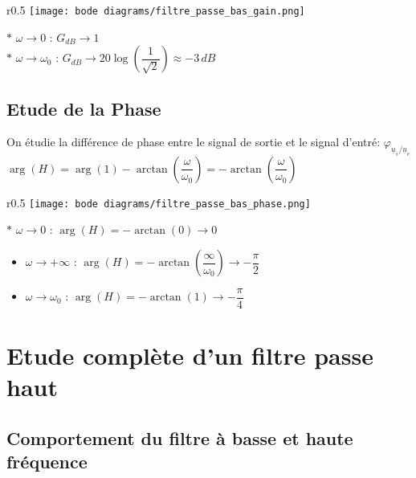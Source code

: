 \documentclass{article}
\begin{document}
\begin{wrapfigure}[5]{r}{0.5\textwidth}
    \centering
    \vspace{-1cm}
    \texttt{[image: bode diagrams/filtre\_passe\_bas\_gain.png]}
\end{wrapfigure}

    $\ast$ $\omega \rightarrow 0$ : $G_{dB} \rightarrow 1$\\
    \indent $\ast$ $\omega \rightarrow \omega_0$ : $G_{dB} \rightarrow 20\log{\left(\dfrac{1}{\sqrt{2}}\right)} \approx -3\,dB$

\vspace{3cm}

\subsection{Etude de la Phase}

\noindent On étudie la différence de phase entre le signal de sortie et le signal d'entré: $\varphi_{\underline{u}_s/\underline{u}_e}$\\
$\arg{(H)} = \arg{(1)}-\arctan{\left( \dfrac{\omega}{\omega_0} \right)} = -\arctan{\left( \dfrac{\omega}{\omega_0} \right)}$


\begin{wrapfigure}[5]{r}{0.5\textwidth}
    \centering
    \vspace{-1.5cm}
    \texttt{[image: bode diagrams/filtre\_passe\_bas\_phase.png]}
\end{wrapfigure}

    $\ast$ $\omega \rightarrow 0$ : $\arg{(H)} = -\arctan{(0)} \rightarrow 0$
\begin{itemize}[label=$\ast$]
    \item $\omega \rightarrow +\infty$ : $\arg{(H)} = -\arctan{\left( \dfrac{\infty}{\omega_0} \right)} \rightarrow -\dfrac{\pi}{2}$ 
    \item $\omega \rightarrow \omega_0$ : $\arg{(H)} = -\arctan{(1)} \rightarrow -\dfrac{\pi}{4}$
\end{itemize}

\clearpage

\section{Etude complète d'un filtre passe haut}

\subsection{Comportement du filtre à basse et haute fréquence}
\end{document}
